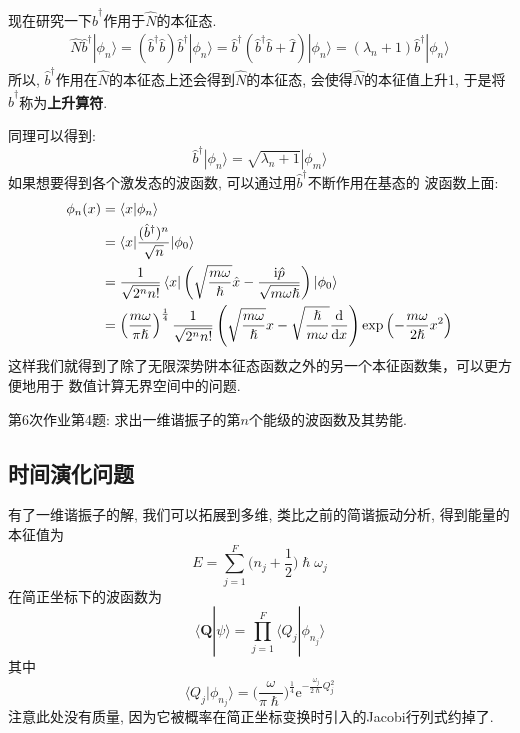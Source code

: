         现在研究一下$\hat{b}^\dagger$作用于$\hat{N}$的本征态.
        \begin{equation}\begin{aligned}
            \hat{N}\hat{b}^\dagger |\phi_n \rangle = (\hat{b}^\dagger \hat{b})\hat{b}^\dagger |\phi_n \rangle = \hat{b}^\dagger (\hat{b}^\dagger\hat{b}+\hat{I})|\phi_n \rangle = (\lambda_n+1) \hat{b}^\dagger |\phi_n \rangle
        \end{aligned}\end{equation}
        所以, $\hat{b}^\dagger$作用在$\hat{N}$的本征态上还会得到$\hat{N}$的本征态, 
        会使得$\hat{N}$的本征值上升1, 于是将$\hat{b}^\dagger$称为\textbf{上升算符}.

        同理可以得到:
        \[ \hat{b}^\dagger|\phi_n\rangle = \sqrt{\lambda_n+1}|\phi_m\rangle \]
        如果想要得到各个激发态的波函数, 可以通过用$\hat{b}^\dagger$不断作用在基态的
        波函数上面: 
        \begin{equation}
            \begin{split}
                \phi_{n}(x) &= \braket{x|\phi_n}\\
                 &= \braket{x|\frac{(\hat{b}^{\dagger})^n}{\sqrt{n}}|\phi_0}\\
                 &= \frac{1}{\sqrt{2^n n!}}\braket{x|\left(\sqrt{\frac{m\omega}{\hslash}}\hat{x} - \frac{\mathrm{i}\hat{p}}{\sqrt{m\omega\hslash}}\right)|\phi_0}\\
                 &= \left(\frac{m\omega}{\pi\hslash}\right)^{\frac{1}{4}}\frac{1}{\sqrt{2^n n!}}\left(\sqrt{\frac{m\omega}{\hslash}}x - \sqrt{\frac{\hslash}{m\omega}}\frac{\mathrm{d}{}}{\mathrm{d}{x}}\right)\exp\left(-\frac{m\omega}{2\hslash}x^2\right)
            \end{split}
        \end{equation}
        这样我们就得到了除了无限深势阱本征态函数之外的另一个本征函数集，可以更方便地用于
        数值计算无界空间中的问题. 
        \begin{asg}
            第6次作业第4题: 求出一维谐振子的第$n$个能级的波函数及其势能.
        \end{asg}

    \subsection{时间演化问题}
        有了一维谐振子的解, 我们可以拓展到多维, 类比之前的简谐振动分析, 得到能量的本征值为
        \[ E = \sum_{j=1}^F \bigg(n_j+\frac 12\bigg)\hslash \omega_j \]
        在简正坐标下的波函数为
        \[ \langle \bm{Q}|\psi \rangle = \prod_{j=1}^F \langle Q_j | \phi_{n_j} \rangle \]
        其中
        \[ \langle Q_j|\phi_{n_j} \rangle = \bigg(\frac {\omega}{\pi \hslash}\bigg)^{\frac 14} \mathrm{e}^{-\frac {\omega_j}{2\hslash} Q_j^2} \]
        注意此处没有质量, 因为它被概率在简正坐标变换时引入的Jacobi行列式约掉了.


